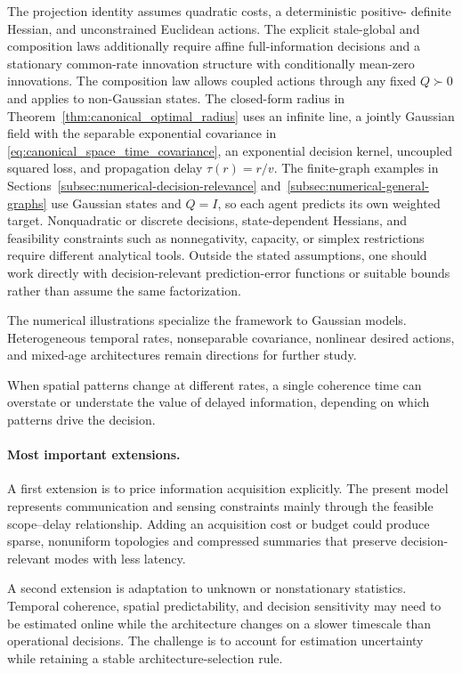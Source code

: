 \documentclass[11pt]{article}
\begin{document}
The projection identity assumes quadratic costs, a deterministic positive-
definite Hessian, and unconstrained Euclidean actions. The explicit stale-global
and composition laws additionally require affine full-information decisions
and a stationary common-rate innovation structure with conditionally
mean-zero innovations. The composition law allows coupled actions through any fixed $Q\succ0$
and applies to non-Gaussian states. The closed-form radius in
Theorem~\ref{thm:canonical_optimal_radius} uses an infinite line, a jointly
Gaussian field with the separable exponential covariance in
\eqref{eq:canonical_space_time_covariance}, an exponential decision
kernel, uncoupled squared loss, and propagation delay $\tau(r)=r/v$.
The finite-graph examples in
Sections~\ref{subsec:numerical-decision-relevance}
and~\ref{subsec:numerical-general-graphs} use Gaussian states and $Q=I$,
so each agent predicts its own weighted target.
Nonquadratic or discrete decisions, state-dependent Hessians, and feasibility
constraints such as nonnegativity, capacity, or simplex restrictions require
different analytical tools. Outside the stated assumptions, one should work
directly with decision-relevant prediction-error functions or suitable bounds
rather than assume the same factorization.

The numerical illustrations specialize the framework to Gaussian models.
Heterogeneous temporal rates, nonseparable covariance, nonlinear desired
actions, and mixed-age architectures remain directions for further study.

When spatial patterns change at different rates, a single coherence time can
overstate or understate the value of delayed information, depending on which
patterns drive the decision.

\paragraph{Most important extensions.}
A first extension is to price information acquisition explicitly. The present
model represents communication and sensing constraints mainly through the
feasible scope--delay relationship. Adding an acquisition cost or budget could
produce sparse, nonuniform topologies and compressed summaries that preserve
decision-relevant modes with less latency.

A second extension is adaptation to unknown or nonstationary statistics.
Temporal coherence, spatial predictability, and decision sensitivity may need
to be estimated online while the architecture changes on a slower timescale
than operational decisions. The challenge is to account for estimation
uncertainty while retaining a stable architecture-selection rule.
\end{document}
